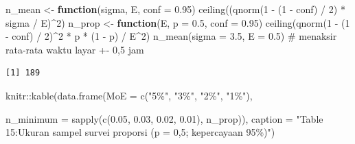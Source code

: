 \documentclass[
  indonesian,
  letterpaper,
]{book}
\newenvironment{Shaded}{\begin{snugshade}}{\end{snugshade}}
\newcommand{\AttributeTok}[1]{\textcolor[rgb]{0.40,0.45,0.13}{#1}}
\newcommand{\CommentTok}[1]{\textcolor[rgb]{0.37,0.37,0.37}{#1}}
\newcommand{\ControlFlowTok}[1]{\textcolor[rgb]{0.00,0.23,0.31}{\textbf{#1}}}
\newcommand{\DecValTok}[1]{\textcolor[rgb]{0.68,0.00,0.00}{#1}}
\newcommand{\FloatTok}[1]{\textcolor[rgb]{0.68,0.00,0.00}{#1}}
\newcommand{\FunctionTok}[1]{\textcolor[rgb]{0.28,0.35,0.67}{#1}}
\newcommand{\NormalTok}[1]{\textcolor[rgb]{0.00,0.23,0.31}{#1}}
\newcommand{\OtherTok}[1]{\textcolor[rgb]{0.00,0.23,0.31}{#1}}
\newcommand{\SpecialCharTok}[1]{\textcolor[rgb]{0.37,0.37,0.37}{#1}}
\newcommand{\StringTok}[1]{\textcolor[rgb]{0.13,0.47,0.30}{#1}}
\begin{document}
\begin{Shaded}
\begin{Highlighting}[]
\NormalTok{n\_mean }\OtherTok{\textless{}{-}} \ControlFlowTok{function}\NormalTok{(sigma, E, }\AttributeTok{conf =} \FloatTok{0.95}\NormalTok{) }\FunctionTok{ceiling}\NormalTok{((}\FunctionTok{qnorm}\NormalTok{(}\DecValTok{1} \SpecialCharTok{{-}}\NormalTok{ (}\DecValTok{1} \SpecialCharTok{{-}}\NormalTok{ conf) }\SpecialCharTok{/} \DecValTok{2}\NormalTok{) }\SpecialCharTok{*}
\NormalTok{sigma }\SpecialCharTok{/}\NormalTok{ E)}\SpecialCharTok{\^{}}\DecValTok{2}\NormalTok{)}
\NormalTok{n\_prop }\OtherTok{\textless{}{-}} \ControlFlowTok{function}\NormalTok{(E, }\AttributeTok{p =} \FloatTok{0.5}\NormalTok{, }\AttributeTok{conf =} \FloatTok{0.95}\NormalTok{) }\FunctionTok{ceiling}\NormalTok{(}\FunctionTok{qnorm}\NormalTok{(}\DecValTok{1} \SpecialCharTok{{-}}\NormalTok{ (}\DecValTok{1} \SpecialCharTok{{-}}\NormalTok{ conf) }\SpecialCharTok{/} \DecValTok{2}\NormalTok{)}\SpecialCharTok{\^{}}\DecValTok{2} \SpecialCharTok{*}
\NormalTok{p }\SpecialCharTok{*}\NormalTok{ (}\DecValTok{1} \SpecialCharTok{{-}}\NormalTok{ p) }\SpecialCharTok{/}\NormalTok{ E}\SpecialCharTok{\^{}}\DecValTok{2}\NormalTok{)}
\FunctionTok{n\_mean}\NormalTok{(}\AttributeTok{sigma =} \FloatTok{3.5}\NormalTok{, }\AttributeTok{E =} \FloatTok{0.5}\NormalTok{) }\CommentTok{\# menaksir rata{-}rata waktu layar +{-} 0,5 jam}
\end{Highlighting}
\end{Shaded}

\begin{verbatim}
[1] 189
\end{verbatim}

\begin{Shaded}
\begin{Highlighting}[]
\NormalTok{knitr}\SpecialCharTok{::}\FunctionTok{kable}\NormalTok{(}\FunctionTok{data.frame}\NormalTok{(}\AttributeTok{MoE =} \FunctionTok{c}\NormalTok{(}\StringTok{"5\%"}\NormalTok{, }\StringTok{"3\%"}\NormalTok{, }\StringTok{"2\%"}\NormalTok{, }\StringTok{"1\%"}\NormalTok{),}

\AttributeTok{n\_minimum =} \FunctionTok{sapply}\NormalTok{(}\FunctionTok{c}\NormalTok{(}\FloatTok{0.05}\NormalTok{, }\FloatTok{0.03}\NormalTok{, }\FloatTok{0.02}\NormalTok{, }\FloatTok{0.01}\NormalTok{), n\_prop)),}
\AttributeTok{caption =} \StringTok{"Table 15:Ukuran sampel survei proporsi (p = 0,5; kepercayaan 95\%)"}\NormalTok{)}
\end{Highlighting}
\end{Shaded}
\end{document}
